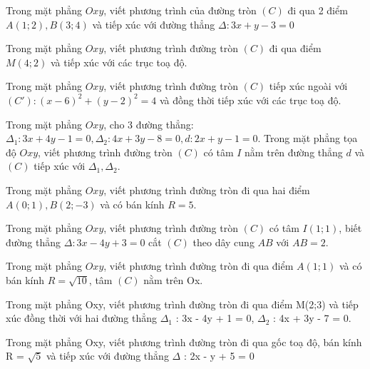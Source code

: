 \documentclass[12pt,a4paper]{book}
\begin{document}
\begin{ex}
Trong mặt phẳng $Oxy$, viết phương trình của đường tròn $(C)$ đi qua 2 điểm $A(1;2), B(3;4)$ và tiếp xúc với đường thẳng $\Delta : 3x+y-3=0$
\loigiai{}
\end{ex}

\begin{ex}
Trong mặt phẳng $Oxy$, viết phương trình đường tròn $(C)$ đi qua điểm $M(4;2)$ và tiếp xúc với các trục toạ độ.
\loigiai{}
\end{ex}

\begin{ex}
Trong mặt phẳng $Oxy$, viết phương trình đường tròn $(C)$ tiếp xúc ngoài với $(C') : (x-6)^2+(y-2)^2=4$ và đồng thời tiếp xúc với các trục toạ độ.
\loigiai{}
\end{ex}

\begin{ex}
Trong mặt phẳng $Oxy$, cho 3 đường thẳng: $\Delta_1 : 3x+4y-1=0, \Delta_2 : 4x+3y-8=0, d : 2x+y-1=0$. Trong mặt phẳng tọa độ $Oxy$, viết phương trình đường tròn $(C)$ có tâm $I$ nằm trên đường thẳng $ d $ và $(C)$ tiếp xúc với $\Delta_1, \Delta_2$.
\loigiai{}
\end{ex}

\begin{ex}
Trong mặt phẳng $Oxy$, viết phương trình đường tròn đi qua hai điểm $A(0;1), B(2;-3)$ và có bán kính $R=5$.
\loigiai{}
\end{ex}

\begin{ex}
Trong mặt phẳng $Oxy$, viết phương trình đường tròn $(C)$ có tâm $I(1;1)$, biết đường thẳng $\Delta : 3x-4y+3=0$ cắt $(C)$ theo dây cung $AB$ với $AB=2$.
\loigiai{}
\end{ex}

\begin{ex}
Trong mặt phẳng $Oxy$, viết phương trình đường tròn đi qua điểm $A(1;1)$ và có bán kính $R=\sqrt{10}$, tâm $(C)$ nằm trên Ox.
\loigiai{}
\end{ex}

\begin{ex}
Trong mặt phẳng Oxy, viết phương trình đường tròn đi qua điểm M(2;3) và tiếp xúc đồng thời với hai đường thẳng $\Delta_1$ : 3x - 4y + 1 = 0, $\Delta_2$ : 4x + 3y - 7 = 0.
\loigiai{}
\end{ex}

\begin{ex}
Trong mặt phẳng Oxy, viết phương trình đường tròn đi qua gốc toạ độ, bán kính R = $\sqrt{5}$ và tiếp xúc với đường thẳng $\Delta$ : 2x - y + 5 = 0
\loigiai{}
\end{ex}
\end{document}
